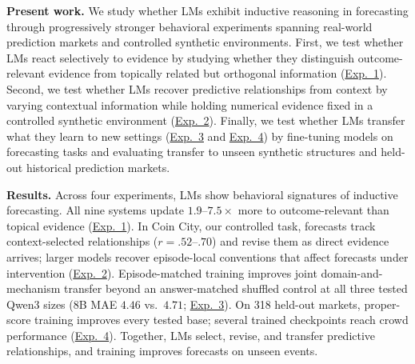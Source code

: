 \noindent
\textbf{Present work.}
We study whether LMs exhibit inductive reasoning in forecasting through
progressively stronger behavioral experiments spanning real-world prediction
markets and controlled synthetic environments. First, we test whether LMs react
selectively to evidence by studying whether they distinguish outcome-relevant
evidence from topically related but orthogonal information
(\hyperref[sec:exp1]{Exp.~1}). Second, we test whether LMs recover predictive
relationships from context by varying contextual information while holding
numerical evidence fixed in a controlled synthetic environment
(\hyperref[sec:exp2]{Exp.~2}). Finally, we test whether LMs transfer what they
learn to new settings (\hyperref[sec:exp3]{Exp.~3} and
\hyperref[sec:exp4]{Exp.~4}) by fine-tuning models on forecasting tasks and
evaluating transfer to unseen synthetic structures and held-out historical
prediction markets.

\noindent\textbf{Results.}
Across four experiments, LMs show behavioral signatures of inductive forecasting.
All nine systems update $1.9$--$7.5\times$ more to outcome-relevant than topical
evidence (\hyperref[sec:exp1]{Exp.~1}). In Coin City, our controlled task,
forecasts track context-selected relationships ($r=.52$--$.70$) and revise them
as direct evidence arrives; larger models recover episode-local conventions that
affect forecasts under intervention (\hyperref[sec:exp2]{Exp.~2}). Episode-matched
training improves joint domain-and-mechanism transfer beyond an answer-matched
shuffled control at all three tested Qwen3 sizes (8B MAE $4.46$ vs.~$4.71$;
\hyperref[sec:exp3]{Exp.~3}). On 318
held-out markets, proper-score training improves every tested base; several
trained checkpoints reach crowd performance (\hyperref[sec:exp4]{Exp.~4}).
Together, LMs select, revise, and transfer predictive relationships, and training
improves forecasts on unseen events.
